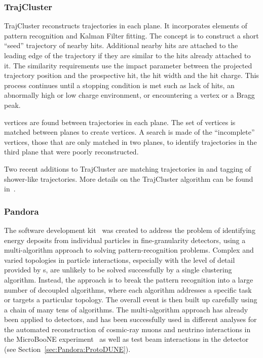 \subsubsection{TrajCluster}\label{sec:TrajCluster}
TrajCluster reconstructs \twod trajectories in each plane. It incorporates elements of pattern recognition and Kalman Filter fitting. The concept is to construct a short ``seed'' trajectory of nearby hits. Additional nearby hits are attached to the leading edge of the trajectory if they are similar to the hits already attached to it. The similarity requirements use the impact parameter between the projected trajectory position and the prospective hit, the hit width and the hit charge. This process continues until a stopping condition is met such as lack of hits, an abnormally high or low charge environment, or encountering a \twod vertex or a Bragg peak.

\twod vertices are found between trajectories in each plane. The set of \twod vertices is matched between planes to create \threed vertices. A search is made of the ``incomplete'' \threed vertices, those that are only matched in two planes, to identify trajectories in the third plane that were poorly reconstructed.

Two recent additions to TrajCluster are matching trajectories in \threed and tagging of shower-like trajectories. More details on the TrajCluster algorithm can be found in~\cite{ref:trajcluster}.



\subsubsection{Pandora}\label{sec:Pandora}

The  software development kit~\cite{Marshall:2015rfa} was created to address the problem of identifying energy deposits from individual particles in fine-granularity detectors, using a multi-algorithm approach to solving pattern-recognition problems. Complex and varied topologies in particle interactions, especially with the level of detail provided by \lartpc{}s, are unlikely to be solved successfully by a single clustering algorithm. Instead, the  approach is to break the pattern recognition into a large number of decoupled algorithms, where each algorithm addresses a specific task or targets a particular topology. The overall event is then built up carefully using a chain of many tens of algorithms. The  multi-algorithm approach has already been applied to \lartpc{} detectors, and has been successfully used in different analyses for the automated reconstruction of cosmic-ray muons and neutrino interactions in the MicroBooNE experiment~\cite{Acciarri:2017hat} as well as test beam interactions in the  detector (see Section~\ref{sec:Pandora:ProtoDUNE}).


